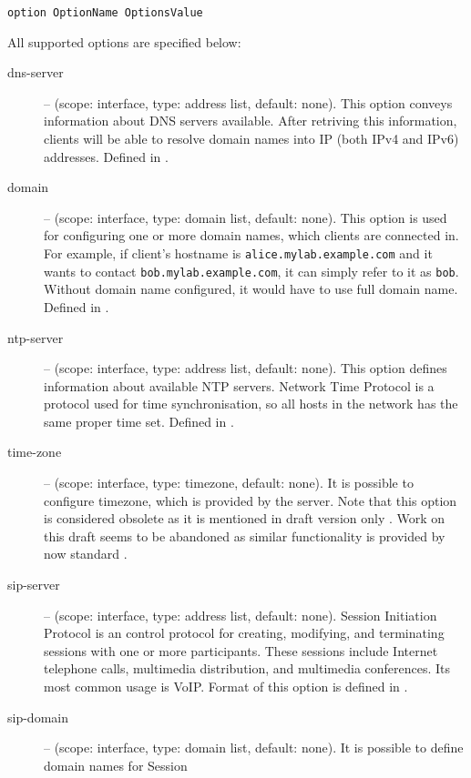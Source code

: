 \begin{verbatim}
option OptionName OptionsValue
\end{verbatim}

All supported options are specified below:

\begin{description}
 \item[dns-server] -- (scope: interface, type: address list, default:
	    none). This option conveys information about DNS servers
	    available. After retriving this information, clients will be
	    able to resolve domain names into IP (both IPv4 and IPv6)
	    addresses. Defined in \cite{rfc3596}.
 \item[domain] -- (scope: interface, type: domain list, default:
	    none). This option is used for configuring one or more domain 
	    names, which clients are connected in. For example, if
	    client's hostname is \verb+alice.mylab.example.com+ and it wants to
	    contact \verb+bob.mylab.example.com+, it can simply refer to it as
	    \verb+bob+. Without domain name configured, it would have to
	    use full domain name. Defined in \cite{rfc3596}.
 \item[ntp-server] -- (scope: interface, type: address list, default:
	    none). This option defines information about available NTP
	    servers. Network Time Protocol \cite{rfc2030} is a protocol used
	    for time synchronisation, so all hosts in the network has
	    the same proper time set. Defined in \cite{rfc4075}.
 \item[time-zone] -- (scope: interface, type: timezone, default:
	    none). It is possible to configure timezone, which is
            provided by the server. Note that this option is
	    considered obsolete as it is mentioned in draft version only
	    \cite{draft-timezone}. Work on this draft seems to be
	    abandoned as similar functionality is provided by now
	    standard \cite{rfc4075}.
 \item[sip-server] -- (scope: interface, type: address list, default:
	    none). Session Initiation Protocol \cite{rfc3263} is an
	    control protocol for creating, modifying, and terminating
	    sessions with one or more participants. These sessions
	    include Internet telephone calls, multimedia distribution,
	    and multimedia conferences. Its most common usage is
	    VoIP. Format of this option is defined in \cite{rfc3319}.
 \item[sip-domain] -- (scope: interface, type: domain list, default:
	    none). It is possible to define domain names for Session

\end{description}
